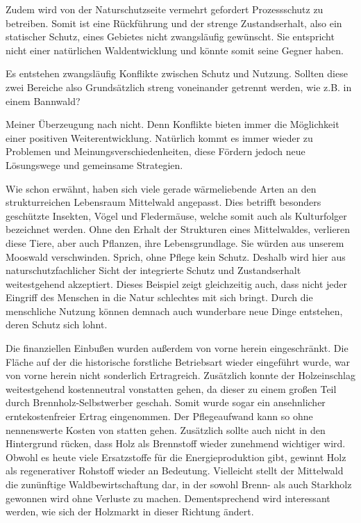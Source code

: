 \documentclass[12pt]{article}
\begin{document}
Zudem wird von der Naturschutzseite vermehrt gefordert Prozessschutz zu betreiben. Somit ist eine
Rückführung und der strenge Zustandserhalt, also ein statischer Schutz, eines Gebietes nicht 
zwangsläufig gewünscht. Sie entspricht nicht einer natürlichen Waldentwicklung und könnte somit 
seine Gegner haben.

Es entstehen zwangsläufig Konflikte zwischen Schutz und Nutzung. Sollten diese zwei Bereiche also
Grundsätzlich streng voneinander getrennt werden, wie z.B. in einem Bannwald?

Meiner Überzeugung nach nicht. Denn Konflikte bieten immer die Möglichkeit einer positiven 
Weiterentwicklung. Natürlich kommt es immer wieder zu Problemen und Meinungsverschiedenheiten,
diese Fördern jedoch neue Lösungswege und gemeinsame Strategien.

Wie schon erwähnt, haben sich viele gerade wärmeliebende Arten an den strukturreichen Lebensraum Mittelwald angepasst.
Dies betrifft besonders geschützte Insekten, Vögel und Fledermäuse, welche somit auch als Kulturfolger
bezeichnet werden. Ohne den Erhalt der Strukturen eines Mittelwaldes, verlieren diese Tiere, aber auch
Pflanzen, ihre Lebensgrundlage. Sie würden aus unserem Mooswald verschwinden. Sprich, ohne Pflege kein
Schutz. Deshalb wird hier aus naturschutzfachlicher Sicht der integrierte Schutz und Zustandserhalt 
weitestgehend akzeptiert. Dieses Beispiel zeigt gleichzeitig auch, dass nicht jeder Eingriff des Menschen 
in die Natur schlechtes mit sich bringt. Durch die menschliche Nutzung können demnach auch wunderbare
neue Dinge entstehen, deren Schutz sich lohnt.

Die finanziellen Einbußen wurden außerdem von vorne herein eingeschränkt. Die Fläche auf der die historische
forstliche Betriebsart wieder eingeführt wurde, war von vorne herein nicht sonderlich Ertragreich.
Zusätzlich konnte der Holzeinschlag weitestgehend kostenneutral vonstatten gehen, da dieser zu einem großen Teil
durch Brennholz-Selbstwerber geschah. Somit wurde sogar ein ansehnlicher erntekostenfreier Ertrag eingenommen.
Der Pflegeaufwand kann so ohne nennenswerte Kosten von statten gehen. Zusätzlich sollte auch nicht in
den Hintergrund rücken, dass Holz als Brennstoff wieder zunehmend wichtiger wird. Obwohl es heute viele
Ersatzstoffe für die Energieproduktion gibt, gewinnt Holz als regenerativer Rohstoff wieder an Bedeutung.
Vielleicht stellt der Mittelwald die zunünftige Waldbewirtschaftung dar, in der sowohl Brenn- als auch Starkholz
gewonnen wird ohne Verluste zu machen. Dementsprechend wird interessant werden, wie sich der Holzmarkt
in dieser Richtung ändert.
\end{document}
